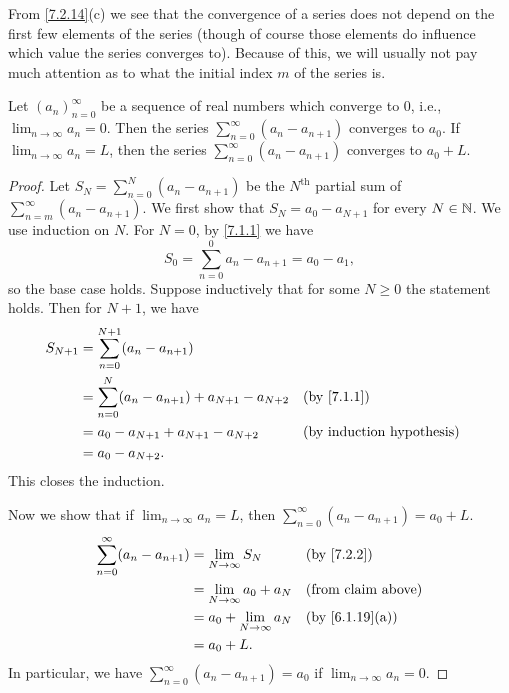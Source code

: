 \begin{note}
  From \cref{7.2.14}(c) we see that the convergence of a series does not depend on the first few elements of the series
  (though of course those elements do influence which value the series converges to).
  Because of this, we will usually not pay much attention as to what the initial index \(m\) of the series is.
\end{note}

\begin{lem}\label{7.2.15}
  Let \((a_n)_{n = 0}^\infty\) be a sequence of real numbers which converge to \(0\), i.e., \(\lim_{n \to \infty} a_n = 0\).
  Then the series \(\sum_{n = 0}^\infty (a_n - a_{n + 1})\) converges to \(a_0\).
  If \(\lim_{n \to \infty} a_n = L\), then the series \(\sum_{n = 0}^\infty (a_n - a_{n + 1})\) converges to \(a_0 + L\).
\end{lem}

\begin{proof}
  Let \(S_N = \sum_{n = 0}^N (a_n - a_{n + 1})\) be the \(N^{\text{th}}\) partial sum of \(\sum_{n = m}^\infty (a_n - a_{n + 1})\).
  We first show that \(S_N = a_0 - a_{N + 1}\) for every \(N \in \mathbb{N}\).
  We use induction on \(N\).
  For \(N = 0\), by \cref{7.1.1} we have
  \[
    S_0 = \sum_{n = 0}^0 a_n - a_{n + 1} = a_0 - a_1,
  \]
  so the base case holds.
  Suppose inductively that for some \(N \geq 0\) the statement holds.
  Then for \(N + 1\), we have
  \begin{align*}
    S_{N + 1} & = \sum_{n = 0}^{N + 1} (a_n - a_{n + 1})                                   \\
              & = \sum_{n = 0}^N (a_n - a_{n + 1}) + a_{N + 1} - a_{N + 2} &  & \by{7.1.1} \\
              & = a_0 - a_{N + 1} + a_{N + 1} - a_{N + 2}                  &  & \byIH      \\
              & = a_0 - a_{N + 2}.
  \end{align*}
  This closes the induction.

  Now we show that if \(\lim_{n \to \infty} a_n = L\), then \(\sum_{n = 0}^\infty (a_n - a_{n + 1}) = a_0 + L\).
  \begin{align*}
    \sum_{n = 0}^\infty (a_n - a_{n + 1}) & = \lim_{N \to \infty} S_N       &  & \by{7.2.2}                   \\
                                          & = \lim_{N \to \infty} a_0 + a_N &  & \text{(from claim above)}    \\
                                          & = a_0 + \lim_{N \to \infty} a_N &  & \text{(by \cref{6.1.19}(a))} \\
                                          & = a_0 + L.
  \end{align*}
  In particular, we have \(\sum_{n = 0}^\infty (a_n - a_{n + 1}) = a_0\) if \(\lim_{n \to \infty} a_n = 0\).
\end{proof}


